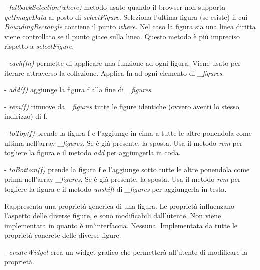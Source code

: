 \begin{elencopuntato}[\subsubsecindent]
\item[-] \textit{fallbackSelection(where)} metodo usato quando il browser non supporta \textit{getImageData} al posto di \textit{selectFigure}. Seleziona l'ultima figura (se esiste) il cui \textit{BoundingRectangle} contiene il punto \textit{where}. Nel caso la figura sia una linea diritta viene controllato se il punto giace sulla linea. Questo metodo \`e pi\`u impreciso rispetto a \textit{selectFigure}.
\item[-]  \textit{each(fn)} permette di applicare una funzione ad ogni figura. Viene usato per iterare attraverso la collezione. Applica fn ad ogni elemento di \textit{{\_}figures}. 
\item[-]  \textit{add(f)} aggiunge la figura f alla fine di \textit{{\_}figures}.
\item[-]  \textit{rem(f)} rimuove da \textit{{\_}figures} tutte le figure identiche (ovvero aventi lo stesso indirizzo) di f.
\item[-] \textit{toTop(f)} prende la figura f e l'aggiunge in cima a tutte le altre ponendola come ultima nell'array \textit{{\_}figures}. Se \`e gi\`a presente, la sposta. Usa il metodo \textit{rem} per togliere la figura e il metodo \textit{add} per aggiungerla in coda.
\item[-] \textit{toBottom(f)} prende la figura f e l'aggiunge sotto tutte le altre ponendola come prima nell'array \textit{{\_}figures}. Se \`e gi\`a presente, la sposta. Usa il metodo \textit{rem} per togliere la figura e il metodo \textit{unshift} di \textit{{\_}figures} per aggiungerla in testa.
\end{elencopuntato}


Rappresenta una propriet\`a generica di una figura. Le propriet\`a influenzano 
l'aspetto delle diverse figure, e sono modificabili dall'utente. Non viene implementata in quanto \`e un'interfaccia.
Nessuna.
Implementata da tutte le propriet\`a concrete delle diverse figure.
\begin{elencopuntato}[\subsubsecindent]
\item[-] \textit{createWidget} crea un widget grafico che permetter\`a all'utente di modificare la propriet\`a.
\end{elencopuntato}


